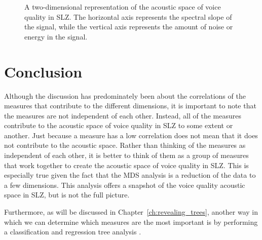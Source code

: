 \begin{figure}[h!]
    \centering
    \caption{A two-dimensional representation of the acoustic space of voice quality in SLZ. The horizontal axis represents the spectral slope of the signal, while the vertical axis represents the amount of noise or energy in the signal.}
    \label{fig:acoustic_space}
\end{figure}

\section{Conclusion} \label{sec:acousticlandscape:conclusion}

Although the discussion has predominately been about the correlations of the measures that contribute to the different dimensions, it is important to note that the measures are not independent of each other. Instead, all of the measures contribute to the acoustic space of voice quality in SLZ to some extent or another. Just because a measure has a low correlation does not mean that it does not contribute to the acoustic space. Rather than thinking of the measures as independent of each other, it is better to think of them as a group of measures that work together to create the acoustic space of voice quality in SLZ. This is especially true given the fact that the MDS analysis is a reduction of the data to a few dimensions. This analysis offers a snapshot of the voice quality acoustic space in SLZ, but is not the full picture. 

Furthermore, as will be discussed in Chapter~\ref{ch:revealing_trees}, another way in which we can determine which measures are the most important is by performing a classification and regression tree analysis \citep{breimanClassificationRegressionTrees1986,breimanBaggingPredictors1996,breimanRandomForests2001}.